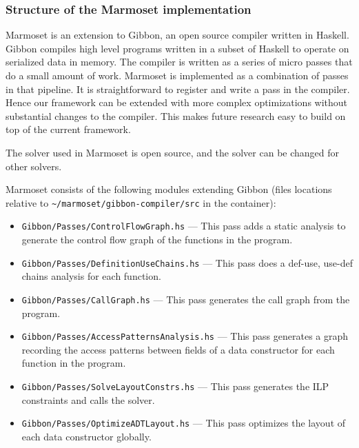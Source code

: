 \hypertarget{structure-of-the-marmoset-implementation}{%
\subsubsection{Structure of the Marmoset
implementation}\label{structure-of-the-marmoset-implementation}}

Marmoset is an extension to Gibbon, an open source compiler written in
Haskell. Gibbon compiles high level programs written in a subset of
Haskell to operate on serialized data in memory. The compiler is written
as a series of micro passes that do a small amount of work. Marmoset is
implemented as a combination of passes in that pipeline. It is
straightforward to register and write a pass in the compiler. Hence our
framework can be extended with more complex optimizations without
substantial changes to the compiler. This makes future research easy to
build on top of the current framework.

The solver used in Marmoset is open source, and the solver can be
changed for other solvers.

Marmoset consists of the following modules extending Gibbon (files
locations relative to
\texttt{\textasciitilde{}/marmoset/gibbon-compiler/src} in the
container):

\begin{itemize}
\item
  \texttt{Gibbon/Passes/ControlFlowGraph.hs} --- This pass adds a static
  analysis to generate the control flow graph of the functions in the
  program.
\item
  \texttt{Gibbon/Passes/DefinitionUseChains.hs} --- This pass does a
  def-use, use-def chains analysis for each function.
\item
  \texttt{Gibbon/Passes/CallGraph.hs} --- This pass generates the call
  graph from the program.
\item
  \texttt{Gibbon/Passes/AccessPatternsAnalysis.hs} --- This pass
  generates a graph recording the access patterns between fields of a
  data constructor for each function in the program.
\item
  \texttt{Gibbon/Passes/SolveLayoutConstrs.hs} --- This pass generates
  the ILP constraints and calls the solver.
\item
  \texttt{Gibbon/Passes/OptimizeADTLayout.hs} --- This pass optimizes
  the layout of each data constructor globally.
\end{itemize}
